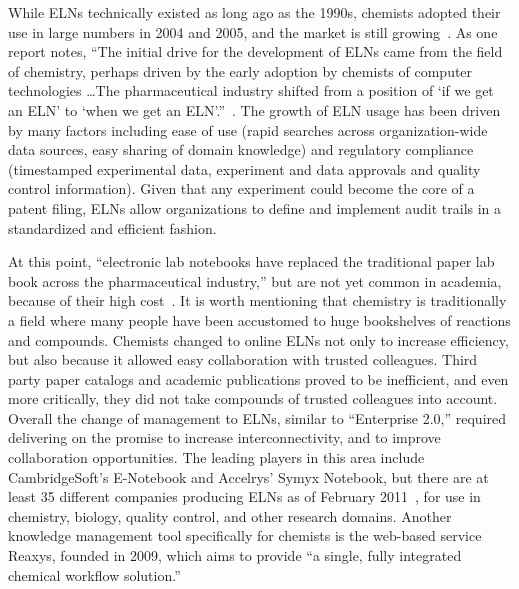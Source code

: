 \documentclass{sig-alternate}
\begin{document}
While ELNs technically existed as long ago as the 1990s, chemists
adopted their use in large numbers in 2004 and 2005, and the market is
still growing~\cite{ELNstatus}. As one report notes, ``The initial
drive for the development of ELNs came from the field of chemistry,
perhaps driven by the early adoption by chemists of computer
technologies \ldots The pharmaceutical industry shifted from a
position of `if we get an ELN' to `when we get an
ELN'.''~\cite{ELNstatus}. The growth of ELN usage has been
driven by many factors including ease of use (rapid searches across
organization-wide data sources, easy sharing of domain knowledge) and
regulatory compliance (timestamped experimental data, experiment and
data approvals and quality control information). Given that any experiment could
become the core of a patent filing, ELNs allow organizations to define
and implement audit trails in a standardized and efficient fashion.

At this point, ``electronic lab notebooks have replaced the
traditional paper lab book across the pharmaceutical industry,'' but
are not yet common in academia, because of their high
cost~\cite{WavingGoodbye}.  It is worth mentioning that chemistry is
traditionally a field where many people have been accustomed to huge
bookshelves of reactions and compounds. Chemists changed to online
ELNs not only to increase efficiency, but also because it allowed easy
collaboration with trusted colleagues. Third party paper catalogs and
academic publications proved to be inefficient, and even more
critically, they did not take compounds of trusted colleagues into
account. Overall the change of management to ELNs, similar to
``Enterprise 2.0,'' required delivering on the promise to increase
interconnectivity, and to improve collaboration opportunities.  The
leading players in this area include CambridgeSoft's E-Notebook and
Accelrys' Symyx Notebook, but there are at least 35 different
companies producing ELNs as of February 2011~\cite{ELNreview}, for use
in chemistry, biology, quality control, and other research domains.  Another
knowledge management tool specifically for chemists is the web-based
service Reaxys, founded in 2009, which aims to provide ``a
single, fully integrated chemical workflow solution.''
\end{document}
